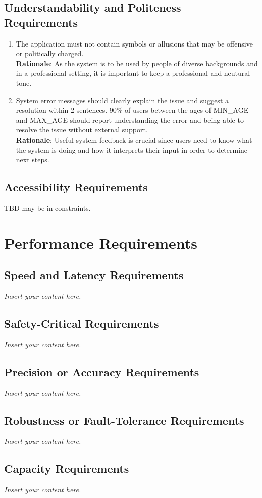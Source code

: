 \documentclass[12pt]{article}
\newcommand{\lips}{\textit{Insert your content here.}}
\begin{document}
\subsection{Understandability and Politeness Requirements}
\begin{enumerate}[{UH-UP}1.]
    \item The application must not contain symbols or allusions that
      may be offensive or politically charged.\\
      \textbf{Rationale}: As the system is to be used by people of diverse backgrounds
      and in a professional setting, it is important to keep a professional and
      neutural tone.
    \item System error messages should clearly explain the issue and suggest a resolution
      within 2 sentences. 90\% of users between the ages of {MIN\_AGE} and {MAX\_AGE}
      should report understanding the error and being able to resolve the issue without
      external support.\\
      \textbf{Rationale}: Useful system feedback is crucial since users need to
      know what the system is doing and how it interprets their input in order to
      determine next steps.
\end{enumerate}
\subsection{Accessibility Requirements}
TBD may be in constraints.
\section{Performance Requirements}
\subsection{Speed and Latency Requirements}
\lips
\subsection{Safety-Critical Requirements}
\lips
\subsection{Precision or Accuracy Requirements}
\lips
\subsection{Robustness or Fault-Tolerance Requirements}
\lips
\subsection{Capacity Requirements}
\lips
\end{document}
